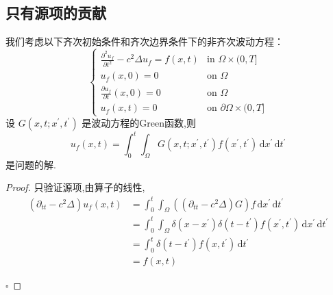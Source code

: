 \documentclass[../../main.tex]{subfiles}
\begin{document}
\subsection{只有源项的贡献}

\begin{theorem}
    我们考虑以下齐次初始条件和齐次边界条件下的非齐次波动方程：
    $$ \begin{cases} \frac{\partial^2 u_f}{\partial t^2} - c^2 \Delta u_f = f(x,t) & \text{in } \Omega \times (0, T] \\ u_f(x,0) = 0 & \text{on } \Omega \\ \frac{\partial u_f}{\partial t}(x,0) = 0 & \text{on } \Omega \\ u_f(x,t) = 0 & \text{on } \partial \Omega \times (0, T] \end{cases} $$
    设 \(  G \left( x,t;x^{\prime} ,t^{\prime}  \right)  \) 是波动方程的Green函数,则 \[
    u_{f}\left( x,t \right)= \int_{0}^{t}\int_{ \Omega }G\left( x,t;x^{\prime} ,t^{\prime}  \right)f\left( x^{\prime} ,t^{\prime}  \right)\,\mathrm{d} x^{\prime} \,\mathrm{d} t^{\prime}    
    \]是问题的解.
\end{theorem}
\begin{proof}
    只验证源项,由算子的线性, \[
    \begin{aligned}
    \left(  \partial _{tt}-c^{2} \Delta  \right)u_{f}\left( x,t \right) &=  \int_{0}^{t}\int_{ \Omega } \left( \left(  \partial _{tt}-c^{2} \Delta  \right)G \right)  f\,\mathrm{d} x^{\prime} \,\mathrm{d} t^{\prime} \\ 
     &=    \int_{0}^{t}\int_{ \Omega } \delta \left( x-x^{\prime}  \right) \delta \left( t-t^{\prime}  \right)f\left( x^{\prime} ,t^{\prime}  \right)\,\mathrm{d} x^{\prime} \,\mathrm{d} t^{\prime}\\ 
      &= \int_{0}^{t} \delta \left( t-t^{\prime}  \right)f\left( x,t^{\prime}  \right)\,\mathrm{d} t^{\prime}       \\ 
       &= f\left( x,t \right) 
    \end{aligned}
    \]

    \hfill $\square$
\end{proof}
\end{document}
